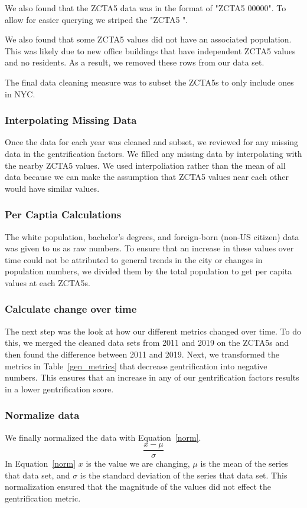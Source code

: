 \documentclass[conference]{IEEEtran}
\begin{document}
We also found that the ZCTA5 data was in the format of "ZCTA5 00000". To allow for easier querying we striped the "ZCTA5 ".

We also found that some ZCTA5 values did not have an associated population. This was likely due to new office buildings that have independent ZCTA5 values and no residents. As a result, we removed these rows from our data set.

The final data cleaning measure was to subset the ZCTA5s to only include ones in NYC.

\subsubsection{Interpolating Missing Data}
Once the data for each year was cleaned and subset, we reviewed for any missing data in the gentrification factors. We filled any missing data by interpolating with the nearby ZCTA5 values. We used interpoliation rather than the mean of all data because we can make the assumption that ZCTA5 values near each other would have similar values.

\subsubsection{Per Captia Calculations}
The white population, bachelor's degrees, and foreign-born (non-US citizen) data was given to us as raw numbers. To ensure that an increase in these values over time could not be attributed to general trends in the city or changes in population numbers, we divided them by the total population to get per capita values at each ZCTA5s.

\subsubsection{Calculate change over time}
The next step was the look at how our different metrics changed over time. To do this, we merged the cleaned data sets from 2011 and 2019 on the ZCTA5s and then found the difference between 2011 and 2019. Next, we transformed the metrics in Table~\ref{gen_metrics} that decrease gentrification into negative numbers. This ensures that an increase in any of our gentrification factors results in a lower gentrification score.

\subsubsection{Normalize data}
We finally normalized the data with Equation~\ref{norm}.
\begin{equation}
\frac{x-\mu}{\sigma}\label{norm}
\end{equation}
In Equation~\ref{norm} $x$ is the value we are changing, $\mu$ is the mean of the series that data set, and $\sigma$ is the standard deviation of the series that data set. This normalization ensured that the magnitude of the values did not effect the gentrification metric.
\end{document}
